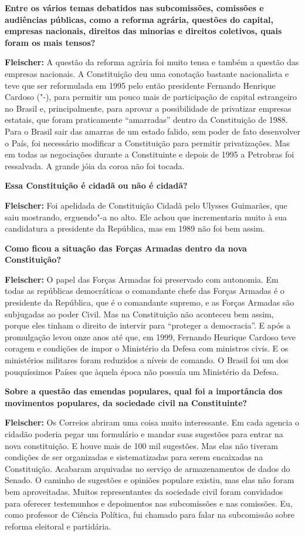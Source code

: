 \textbf{Entre os vários temas debatidos nas subcomissões, comissões e
audiências públicas, como a reforma agrária, questões do capital,
empresas nacionais, direitos das minorias e direitos coletivos, quais
foram os mais tensos?}

\textbf{Fleischer:} A questão da reforma agrária foi muito tensa e
também a questão das empresas nacionais. A Constituição deu uma
conotação bastante nacionalista e teve que ser reformulada em 1995 pelo
então presidente Fernando Henrique Cardoso ("-), para permitir um
pouco mais de participação de capital estrangeiro no Brasil e,
principalmente, para aprovar a possibilidade de privatizar empresas
estatais, que foram praticamente ``amarradas'' dentro da Constituição de
1988. Para o Brasil sair das amarras de um estado falido, sem poder de
fato desenvolver o País, foi necessário modificar a Constituição para
permitir privatizações. Mas em todas as negociações durante a
Constituinte e depois de 1995 a Petrobras foi ressalvada. A grande jóia
da coroa não foi tocada.

\textbf{Essa Constituição é cidadã ou não é cidadã?}

\textbf{Fleischer:} Foi apelidada de Constituição Cidadã pelo Ulysses
Guimarães, que saiu mostrando, erguendo"-a no alto. Ele achou que
incrementaria muito à sua candidatura a presidente da República, mas em
1989 não foi bem assim.

\textbf{Como ficou a situação das Forças Armadas dentro da nova
Constituição?}

\textbf{Fleischer:} O papel das Forças Armadas foi preservado com
autonomia. Em todas as repúblicas democráticas o comandante chefe das
Forças Armadas é o presidente da República, que é o comandante supremo,
e as Forças Armadas são subjugadas ao poder Civil. Mas na Constituição
não aconteceu bem assim, porque eles tinham o direito de intervir para
``proteger a democracia''. E após a promulgação levou onze anos até que,
em 1999, Fernando Henrique Cardoso teve coragem e condições de impor o
Ministério da Defesa com ministros civis. E os ministérios militares
foram reduzidos a níveis de comando. O Brasil foi um dos pouquíssimos
Países que àquela época não possuía um Ministério da Defesa.

\textbf{Sobre a questão das emendas populares, qual foi a importância
dos movimentos populares, da sociedade civil na Constituinte?}

\textbf{Fleischer:} Os Correios abriram uma coisa muito interessante. Em
cada agencia o cidadão poderia pegar um formulário e mandar suas
sugestões para entrar na nova constituição. E houve mais de 100 mil
sugestões. Mas elas não tiveram condições de ser organizadas e
sistematizadas para serem encaixadas na Constituição. Acabaram
arquivadas no serviço de armazenamentos de dados do Senado. O caminho de
sugestões e opiniões populare existiu, mas elas não foram bem
aproveitadas. Muitos representantes da sociedade civil foram convidados
para oferecer testemunhos e depoimentos nas subcomissões e nas
comissões. Eu, como professor de Ciência Política, fui chamado para
falar na subcomissão sobre reforma eleitoral e partidária.

